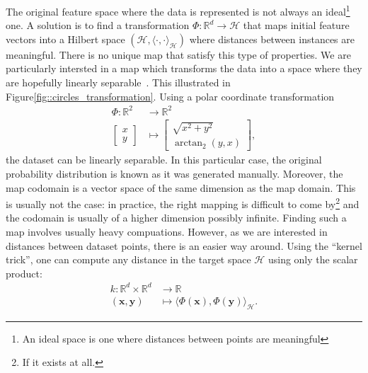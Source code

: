                 The original feature space where the data is represented is not always an ideal\footnote{An ideal space is one where distances between points are meaningful} one.
                A solution is to find a transformation $\Phi: \mathbb{R}^d \rightarrow \mathscr{H}$ that maps initial feature vectors into a Hilbert space $(\mathscr{H}, \langle\cdot{,}\cdot\rangle_{\mathscr{H}})$ where distances between instances are meaningful.
                There is no unique map that satisfy this type of properties.
                We are particularly intersted in a map which transforms the data into a space where they are hopefully linearly separable~\parencite{boser1992training}.
                This illustrated in Figure\ref{fig::circles_transformation}.
                Using a polar coordinate transformation 
                \begin{align*}
                    \Phi: \mathbb{R}^2 &\rightarrow \mathbb{R}^2 \\
                    \begin{bmatrix}
                        x \\
                        y
                    \end{bmatrix} &\mapsto \begin{bmatrix}
                        \sqrt{x^2 + y^2} \\
                        \operatorname{arctan}_2(y, x)
                    \end{bmatrix},
                \end{align*}
                the dataset can be linearly separable.
                In this particular case, the original probability distribution is known as it was generated manually.
                Moreover, the map codomain is a vector space of the same dimension as the map domain.
                This is usually not the case: in practice, the right mapping is difficult to come by\footnote{If it exists at all.} and the codomain is usually of a higher dimension possibly infinite.
                Finding such a map involves usually heavy compuations.
                However, as we are interested in distances between dataset points, there is an easier way around.
                Using the ``kernel trick'', one can compute any distance in the target space $\mathscr{H}$ using only the scalar product:
                \begin{align}
                    \label{eq::kernel_definition}
                    k: \mathbb{R}^d \times \mathbb{R}^d &\rightarrow \mathbb{R}\\
                    (\bm{x}, \bm{y}) &\mapsto \langle\Phi(\bm{x}), \Phi(\bm{y})\rangle_{\mathscr{H}} \nonumber.
                \end{align}
